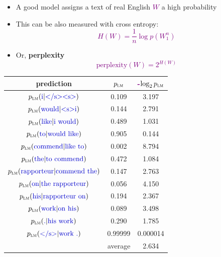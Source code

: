 \documentclass[landscape]{slides}
\newcommand{\example}[1]{\textcolor{darkblue}{\rm #1}}
\newcommand{\maths}[1]{\textcolor{purple}{#1}}
\begin{document}

\vspace{20mm}
\begin{itemize}
\item A good model assigns a text of real English \maths{$W$} a high probability
\item This can be also measured with cross entropy:
\maths{\begin{equation*}
H(W) = \frac{1}{n} \log p(W_1^n)
\end{equation*}}
\vspace{-10mm}
\item Or, {\bf perplexity}
\maths{\begin{equation*}
\text{perplexity}(W) = 2^{H(W)}
\end{equation*}}
\end{itemize}


\begin{center}
\begin{tabular}{c|c|c} 
prediction & \maths{$p_\text{\sc lm}$} & \maths{-$\log_2 p_\text{\sc lm}$} \\ \hline \hline 
$p_\text{\sc lm}(\text{\example{i}}|\text{\example{\textless /s\textgreater \textless s\textgreater}})$ & 0.109 & 3.197 \\ \hline
$p_\text{\sc lm}(\text{\example{would}}| \text{\example{\textless s\textgreater i}})$      & 0.144 & 2.791 \\ \hline
$p_\text{\sc lm}(\text{\example{like}}|\text{\example{i would}})$    & 0.489 & 1.031\\ \hline
$p_\text{\sc lm}(\text{\example{to}}|\text{\example{would like}})$     & 0.905 & 0.144 \\ \hline
$p_\text{\sc lm}(\text{\example{commend}}|\text{\example{like to}})$   & 0.002 & 8.794 \\ \hline
$p_\text{\sc lm}(\text{\example{the}}|\text{\example{to commend}})$    & 0.472 & 1.084 \\ \hline
$p_\text{\sc lm}(\text{\example{rapporteur}}|\text{\example{commend the}})$& 0.147 & 2.763\\ \hline
$p_\text{\sc lm}(\text{\example{on}}|\text{\example{the rapporteur}})$ & 0.056 & 4.150\\ \hline
$p_\text{\sc lm}(\text{\example{his}}|\text{\example{rapporteur on}})$ & 0.194 & 2.367\\ \hline
$p_\text{\sc lm}(\text{\example{work}}|\text{\example{on his}})$       & 0.089 & 3.498 \\ \hline
$p_\text{\sc lm}(\text{\example{.}}|\text{\example{his work}})$        & 0.290 & 1.785 \\ \hline
$p_\text{\sc lm}(\text{\example{\textless /s\textgreater}}|\text{\example{work .}})$       & 0.99999 & 0.000014 \\ \hline \hline
\multicolumn{2}{r|}{average} & 2.634 \\ 
\end{tabular}
\end{center}
\end{document}
